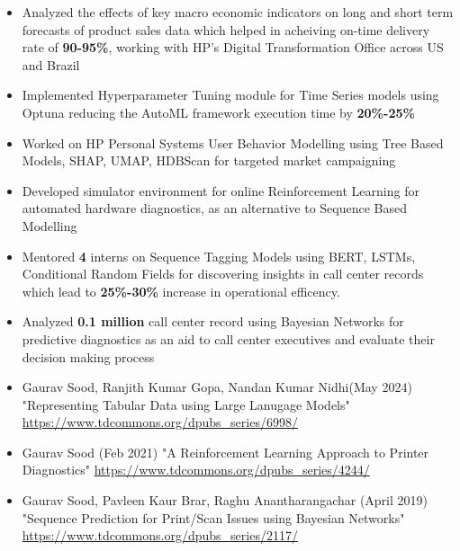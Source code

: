\documentclass[10pt,a4paper,ragged2e,withhyper]{altacv}
\begin{document}
\begin{paracol}{1}
\par\divider
{}

\begin{itemize}
\item Analyzed the effects of key macro economic indicators on long and short
term forecasts of product sales data which helped in acheiving on-time
delivery rate of \textbf{\textbf{90-95\%}}, working with HP's Digital Transformation Office
across US and Brazil
\item Implemented Hyperparameter Tuning module for Time Series models using Optuna
reducing the AutoML framework execution time by \textbf{\textbf{20\%-25\%}}
\item Worked on HP Personal Systems User Behavior Modelling using Tree Based Models,
SHAP, UMAP, HDBScan for targeted market campaigning
\item Developed simulator environment for online Reinforcement Learning for
automated hardware diagnostics, as an alternative to Sequence Based Modelling
\item Mentored \textbf{\textbf{4}} interns on Sequence Tagging Models using BERT, LSTMs,
Conditional Random Fields for discovering insights in call center records
which lead to \textbf{\textbf{25\%-30\%}} increase in operational efficency.
\item Analyzed \textbf{\textbf{0.1 million}} call center record using Bayesian Networks for predictive
diagnostics as an aid to call center executives and evaluate their decision
making process
\end{itemize}


\newpage

\label{sec:orgae0f1a2}
\begin{itemize}
\item Gaurav Sood, Ranjith Kumar Gopa, Nandan Kumar Nidhi(May 2024) "Representing
Tabular Data using Large Lanugage Models"
\url{https://www.tdcommons.org/dpubs\_series/6998/}
\item Gaurav Sood (Feb 2021) "A Reinforcement Learning Approach to Printer Diagnostics"
\url{https://www.tdcommons.org/dpubs\_series/4244/}
\item Gaurav	Sood, Pavleen Kaur Brar, Raghu Anantharangachar (April 2019)
"Sequence Prediction for Print/Scan Issues using Bayesian Networks"
\url{https://www.tdcommons.org/dpubs\_series/2117/}
\end{itemize}


\end{paracol}
\end{document}
